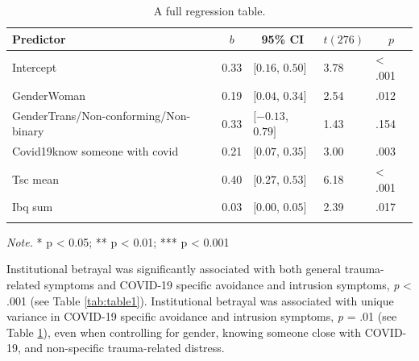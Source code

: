 \documentclass[
  english,
  man,draftall]{apa6}
\begin{document}
\begin{table}[tbp]

\begin{center}
\begin{threeparttable}

\caption{\label{tab:table2}A full regression table.}

\begin{tabular}{lllll}
\toprule
Predictor & \multicolumn{1}{c}{$b$} & \multicolumn{1}{c}{95\% CI} & \multicolumn{1}{c}{$t(276)$} & \multicolumn{1}{c}{$p$}\\
\midrule
Intercept & 0.33 & $[0.16$, $0.50]$ & 3.78 & < .001\\
GenderWoman & 0.19 & $[0.04$, $0.34]$ & 2.54 & .012\\
GenderTrans/Non-conforming/Non-binary & 0.33 & $[-0.13$, $0.79]$ & 1.43 & .154\\
Covid19know someone with covid & 0.21 & $[0.07$, $0.35]$ & 3.00 & .003\\
Tsc mean & 0.40 & $[0.27$, $0.53]$ & 6.18 & < .001\\
Ibq sum & 0.03 & $[0.00$, $0.05]$ & 2.39 & .017\\
\bottomrule
\addlinespace
\end{tabular}

\begin{tablenotes}[para]
\normalsize{\textit{Note.} * p < 0.05; ** p < 0.01; *** p < 0.001}
\end{tablenotes}

\end{threeparttable}
\end{center}

\end{table}

Institutional betrayal was significantly associated with both general trauma-related symptoms and COVID-19 specific avoidance and intrusion symptoms, \emph{p} \textless{} .001 (see Table \ref{tab:table1}). Institutional betrayal was associated with unique variance in COVID-19 specific avoidance and intrusion symptoms, \emph{p} = .01 (see Table \ref{tab:table2}), even when controlling for gender, knowing someone close with COVID-19, and non-specific trauma-related distress.
\end{document}
